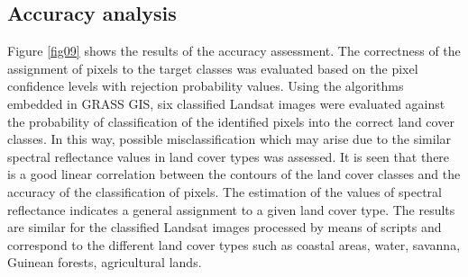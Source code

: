 \documentclass[earth,article,submit,pdftex,moreauthors]{Definitions/mdpi}
\begin{document}
{\subsection{{Accuracy analysis}}

Figure \ref{fig09} shows the {results of the }accuracy {assessment}. {The correctness of the assignment of pixels to the target classes was }evaluated based on the pixel confidence levels with rejection probability values{. Using {the }algorithms embedded in GRASS GIS, six classified} Landsat images {were }evaluated against the probability of classification of the{ identified }pixels into {the }correct land cover classes{. In this way, }possible misclassification {which may arise due} to the similar spectral reflectance values in land cover types {was assessed}. It is seen that there {is a} good linear correlation{ }between the contours of {the }land cover classes and the accuracy of the classification of pixels{. The estimation of the values of }spectral reflectance {indicates} a general assignment to a given land cover type. The results are{ }similar {for the classified } Landsat images processed by means of {scripts and correspond to} the different land cover types {such as }coastal {areas}, water, savanna, Guinean forests, agricultural lands{.} 

}
\end{document}

